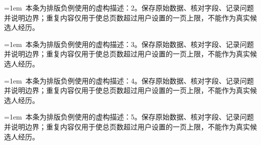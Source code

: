 \documentclass[11pt,a4paper,fontset=fandol]{ctexart}
\begin{document}
\noindent\hangindent=1em\textbullet\ 本条为排版负例使用的虚构描述：2。保存原始数据、核对字段、记录问题并说明边界；重复内容仅用于使总页数超过用户设置的一页上限，不能作为真实候选人经历。\par
\noindent\hangindent=1em\textbullet\ 本条为排版负例使用的虚构描述：3。保存原始数据、核对字段、记录问题并说明边界；重复内容仅用于使总页数超过用户设置的一页上限，不能作为真实候选人经历。\par
\noindent\hangindent=1em\textbullet\ 本条为排版负例使用的虚构描述：4。保存原始数据、核对字段、记录问题并说明边界；重复内容仅用于使总页数超过用户设置的一页上限，不能作为真实候选人经历。\par
\noindent\hangindent=1em\textbullet\ 本条为排版负例使用的虚构描述：5。保存原始数据、核对字段、记录问题并说明边界；重复内容仅用于使总页数超过用户设置的一页上限，不能作为真实候选人经历。\par
\end{document}
